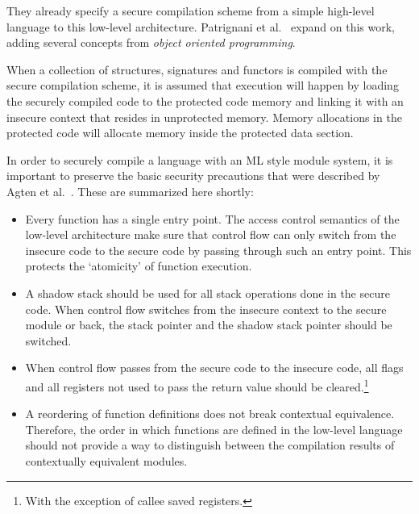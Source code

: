 \documentclass[11pt]{article}
\begin{document}
They already specify a secure compilation scheme from a simple high-level language to this low-level architecture.
Patrignani et al.~\cite{Patrignani} expand on this work, adding several concepts from \emph{object oriented programming}.

When a collection of structures, signatures and functors is compiled with the secure compilation scheme, it is assumed that execution will happen by loading the securely compiled code to the protected code memory and linking it with an insecure context that resides in unprotected memory. Memory allocations in the protected code will allocate memory inside the protected data section.

In order to securely compile a language with an ML style module system, it is important to preserve the basic security precautions that were described by Agten et al.~\cite{Agten:2012:SCM:2354412.2355247}. These are summarized here shortly:

\begin{itemize}
\item Every function has a single entry point.
The access control semantics of the low-level architecture make sure that control flow can only switch from the insecure code to the secure code by passing through such an entry point.
This protects the `atomicity' of function execution.
\item A shadow stack should be used for all stack operations done in the secure code. When control flow switches from the insecure context to the secure module or back, the stack pointer and the shadow stack pointer should be switched.
\item When control flow passes from the secure code to the insecure code, all flags and all registers not used to pass the return value should be cleared.\footnote{With the exception of callee saved registers.}
\item A reordering of function definitions does not break contextual equivalence. Therefore, the order in which functions are defined in the low-level language should not provide a way to distinguish between the compilation results of contextually equivalent modules.
\end{itemize}
\end{document}
